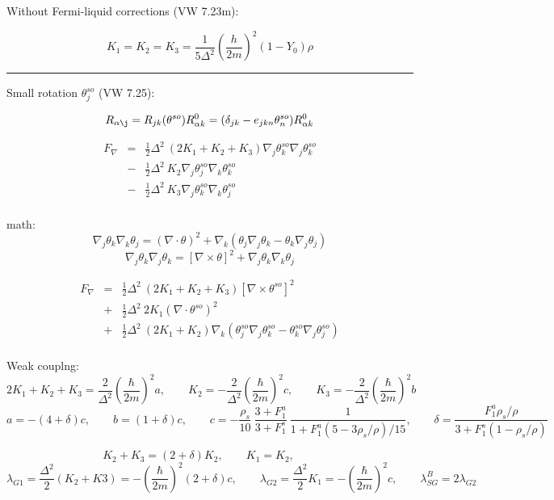 \documentclass[a4paper]{article}
\begin{document}
Without Fermi-liquid corrections (VW 7.23m):

$$
K_1=K_2=K_3 = \frac{1}{5\Delta^2} \left(\frac{h}{2m}\right)^2 (1-Y_0)\rho
$$

\eject

\hrule
\medskip

Small rotation $\theta^{so}_j$ (VW 7.25):

$$
R_{\alpha\j} = R_{jk}(\theta^{so}) R^0_{\alpha k} =
(\delta_{jk} - e_{jkn}\theta^{so}_n) R^0_{\alpha k}
$$

\begin{eqnarray*}
F_\nabla
&=& \frac12 \Delta^2\ (2 K_1 + K_2 + K_3)
\nabla_j\theta^{so}_k \nabla_j\theta^{so}_k\\
&-& \frac12 \Delta^2\ K_2
\nabla_j\theta^{so}_j \nabla_k\theta^{so}_k\\
&-& \frac12 \Delta^2\ K_3
\nabla_j\theta^{so}_k \nabla_k\theta^{so}_j\\
\end{eqnarray*}

math:
$$
\nabla_j \theta_k \nabla_k \theta_j = (\nabla \cdot \theta)^2 +
\nabla_k(\theta_j \nabla_j\theta_k - \theta_k \nabla_j\theta_j)
$$
$$
 \nabla_j \theta_k \nabla_j \theta_k = [\nabla \times \theta]^2 + \nabla_j \theta_k \nabla_k \theta_j
$$

\begin{eqnarray*}
F_\nabla
&=& \frac12 \Delta^2\ (2 K_1 + K_2 + K_3)
[\nabla \times \theta^{so}]^2\\
&+& \frac12 \Delta^2\  2K_1
(\nabla \cdot \theta^{so})^2\\
&+& \frac12 \Delta^2\ (2 K_1+K_2)
\nabla_k(\theta^{so}_j \nabla_j\theta^{so}_k - \theta^{so}_k \nabla_j\theta^{so}_j)\\
\end{eqnarray*}

Weak couplng:
$$
2 K_1 + K_2 + K_3 = \frac{2}{\Delta^2}\left(\frac{\hbar}{2m}\right)^2 a,
\qquad
K_2 = -\frac{2}{\Delta^2}\left(\frac{\hbar}{2m}\right)^2 c,
\qquad
K_3 = -\frac{2}{\Delta^2}\left(\frac{\hbar}{2m}\right)^2 b
$$
$$
a=-(4+\delta)c,\qquad
b= (1+\delta)c,\qquad
c=-\frac{\rho_s}{10}
\ \frac{3+F_1^a}{3+F_1^s}
\ \frac{1}{1+F_1^a(5-3\rho_s/\rho)/15}
,\qquad
\delta = \frac{F_1^a \rho_s/\rho}{3+F_1^s(1-\rho_s/\rho)}
$$

$$
K_2+K_3 = (2+\delta)K_2,\qquad
K_1=K_2,\qquad
$$
$$
\lambda_{G1} = \frac{\Delta^2}{2}(K_2+K3) = -\left(\frac{\hbar}{2m}\right)^2 (2+\delta) c,\qquad
\lambda_{G2} = \frac{\Delta^2}{2}K_1 = -\left(\frac{\hbar}{2m}\right)^2 c,\qquad
\lambda_{SG}^B = 2\lambda_{G2}
$$
\end{document}
